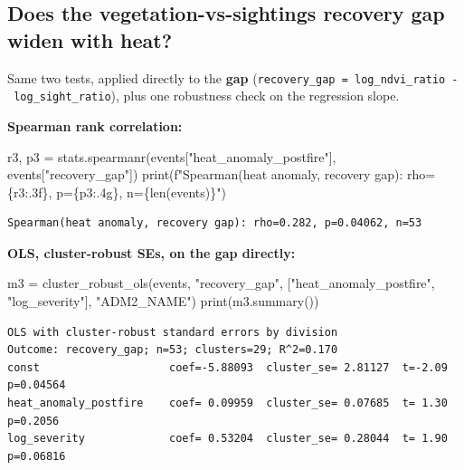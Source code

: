 \documentclass[
  letterpaper,
  DIV=11,
  numbers=noendperiod]{scrartcl}
\newenvironment{Shaded}{\begin{snugshade}}{\end{snugshade}}
\newcommand{\BuiltInTok}[1]{\textcolor[rgb]{0.00,0.23,0.31}{#1}}
\newcommand{\NormalTok}[1]{\textcolor[rgb]{0.00,0.23,0.31}{#1}}
\newcommand{\OperatorTok}[1]{\textcolor[rgb]{0.37,0.37,0.37}{#1}}
\newcommand{\SpecialCharTok}[1]{\textcolor[rgb]{0.37,0.37,0.37}{#1}}
\newcommand{\SpecialStringTok}[1]{\textcolor[rgb]{0.13,0.47,0.30}{#1}}
\newcommand{\StringTok}[1]{\textcolor[rgb]{0.13,0.47,0.30}{#1}}
\begin{document}
\subsection{Does the vegetation-vs-sightings recovery gap widen with
heat?}\label{does-the-vegetation-vs-sightings-recovery-gap-widen-with-heat}

Same two tests, applied directly to the \textbf{gap}
(\texttt{recovery\_gap\ =\ log\_ndvi\_ratio\ -\ log\_sight\_ratio}),
plus one robustness check on the regression slope.

\textbf{Spearman rank correlation:}

\begin{Shaded}
\begin{Highlighting}[]
\NormalTok{r3, p3 }\OperatorTok{=}\NormalTok{ stats.spearmanr(events[}\StringTok{"heat\_anomaly\_postfire"}\NormalTok{], events[}\StringTok{"recovery\_gap"}\NormalTok{])}
\BuiltInTok{print}\NormalTok{(}\SpecialStringTok{f"Spearman(heat anomaly, recovery gap): rho=}\SpecialCharTok{\{}\NormalTok{r3}\SpecialCharTok{:.3f\}}\SpecialStringTok{, p=}\SpecialCharTok{\{}\NormalTok{p3}\SpecialCharTok{:.4g\}}\SpecialStringTok{, n=}\SpecialCharTok{\{}\BuiltInTok{len}\NormalTok{(events)}\SpecialCharTok{\}}\SpecialStringTok{"}\NormalTok{)}
\end{Highlighting}
\end{Shaded}

\begin{verbatim}
Spearman(heat anomaly, recovery gap): rho=0.282, p=0.04062, n=53
\end{verbatim}

\textbf{OLS, cluster-robust SEs, on the gap directly:}

\begin{Shaded}
\begin{Highlighting}[]
\NormalTok{m3 }\OperatorTok{=}\NormalTok{ cluster\_robust\_ols(events, }\StringTok{"recovery\_gap"}\NormalTok{,}
\NormalTok{                        [}\StringTok{"heat\_anomaly\_postfire"}\NormalTok{, }\StringTok{"log\_severity"}\NormalTok{], }\StringTok{"ADM2\_NAME"}\NormalTok{)}
\BuiltInTok{print}\NormalTok{(m3.summary())}
\end{Highlighting}
\end{Shaded}

\begin{verbatim}
OLS with cluster-robust standard errors by division
Outcome: recovery_gap; n=53; clusters=29; R^2=0.170
const                    coef=-5.88093  cluster_se= 2.81127  t=-2.09  p=0.04564
heat_anomaly_postfire    coef= 0.09959  cluster_se= 0.07685  t= 1.30  p=0.2056
log_severity             coef= 0.53204  cluster_se= 0.28044  t= 1.90  p=0.06816
\end{verbatim}
\end{document}
